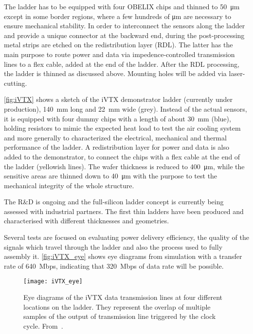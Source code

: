 The ladder has to be equipped with four OBELIX chips and thinned to \SI{50}{\micro m} except in some border regions, where a few hundreds of \unit{\micro m} are necessary to ensure mechanical stability. 
In order to interconnect the sensors along the ladder and provide a unique connector at the backward end, during the post-processing metal strips are etched on the redistribution layer (RDL). The latter has the main purpose to route power and data via impedence-controlled transmission lines to a flex cable, added at the end of the ladder.
After the RDL processing, the ladder is thinned as discussed above. Mounting holes will be added via laser-cutting.


\autoref{fig:iVTX} shows a sketch of the iVTX demonstrator ladder (currently under production), \SI{140}{mm} long and \SI{22}{mm} wide (grey). Instead of the actual sensors, it is equipped with four dummy chips with a length of about \SI{30}{mm} (blue), holding resistors to mimic the expected heat load to test the air cooling system and more generally to characterized the electrical, mechanical and thermal performance of the ladder.
A redistribution layer for power and data is also added to the demonstrator, to connect the chips with a flex cable at the end of the ladder (yellowish lines). The wafer thickness is reduced to \SI{400}{\micro m}, while the sensitive areas are thinned down to \SI{40}{\micro m} with the purpose to test the mechanical integrity of the whole structure.

The R\&D is ongoing and the full-silicon ladder concept is currently being assessed with industrial partners. The first thin ladders have been produced and characterised with different thicknesses and geometries.

Several tests are focused on evaluating power delivery efficiency, the quality of the signals which travel through the ladder and also the process used to fully assembly it. 
\autoref{fig:iVTX_eye} shows eye diagrams from simulation with a transfer rate of \SI{640}{Mbps}, indicating that \SI{320}{Mbps} of data rate will be possible.

\begin{figure}[h!]
\centering
\texttt{[image: iVTX\_eye]}
\caption{Eye diagrams of the iVTX data transmission lines at four different locations on the ladder. They represent the overlap of multiple samples of the output of transmission line triggered by the clock cycle. From~\cite{BelleIIVTX:2023szr}.}
\label{fig:iVTX_eye}
\end{figure}

